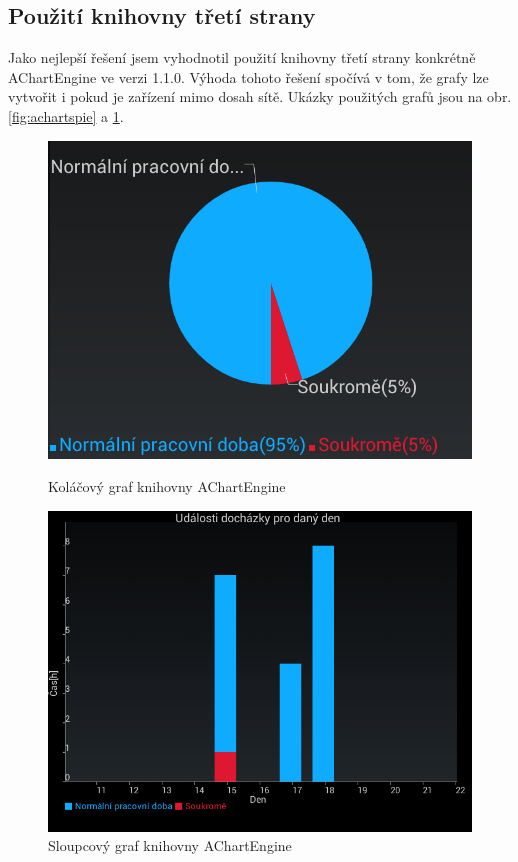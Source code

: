 \documentclass{diplomka}
\begin{document}
\subsection{Použití knihovny třetí strany}
Jako nejlepší řešení jsem vyhodnotil použití knihovny třetí strany konkrétně AChartEngine\cite{achartengine} ve verzi 1.1.0. Výhoda tohoto řešení spočívá v tom, že grafy lze vytvořit i pokud je zařízení mimo dosah sítě. Ukázky použitých grafů jsou na obr. \ref{fig:achartspie} a  \ref{fig:achartsstack}.
\begin{figure}[H]
\centering
\begin{minipage}{.48\textwidth}
  \centering
  \includegraphics[width=1\linewidth]{obr/achartspie.png}
 \caption{Koláčový graf knihovny AChartEngine}
  \label{fig:achartspie}
\end{minipage}\hfill%
\begin{minipage}{.48\textwidth}
   \centering
 \includegraphics[width=1\linewidth]{obr/achartsstack.png}
   \caption{Sloupcový graf knihovny AChartEngine}
  \label{fig:achartsstack}
\end{minipage}
\end{figure}
\end{document}
